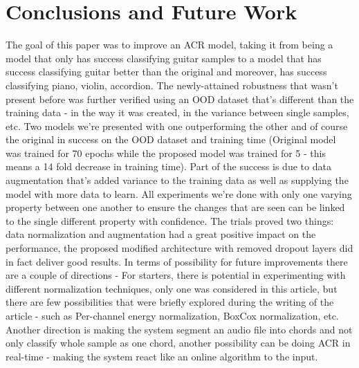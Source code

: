 \documentclass[a4paper]{article}
\begin{document}
\section{Conclusions and Future Work} \label{sec:conclusion}
The goal of this paper was to improve an ACR model, taking it from being a model that only has success classifying guitar samples to a model that has success classifying guitar better than the original and moreover, has success classifying piano, violin, accordion. The newly-attained robustness that wasn't present before was further verified using an OOD dataset that's different than the training data - in the way it was created, in the variance between single samples, etc. Two models we're presented with one outperforming the other and of course the original in success on the OOD dataset and training time (Original model was trained for 70 epochs while the proposed model was trained for 5 - this means a 14 fold decrease in training time). Part of the success is due to data augmentation that's added variance to the training data as well as supplying the model with more data to learn. All experiments we're done with only one varying property between one another to ensure the changes that are seen can be linked to the single different property with confidence.
The trials proved two things: data normalization and augmentation had a great positive impact on the performance, the proposed modified architecture with removed dropout layers did in fact deliver good results.
In terms of possibility for future improvements there are a couple of directions - For starters, there is potential in experimenting with different normalization techniques, only one was considered in this article, but there are few possibilities that were briefly explored during the writing of the article - such as Per-channel energy normalization, BoxCox normalization, etc. Another direction is making the system segment an audio file into chords and not only classify whole sample as one chord, another possibility can be doing ACR in real-time - making the system react like an online algorithm to the input.
%


\end{document}
